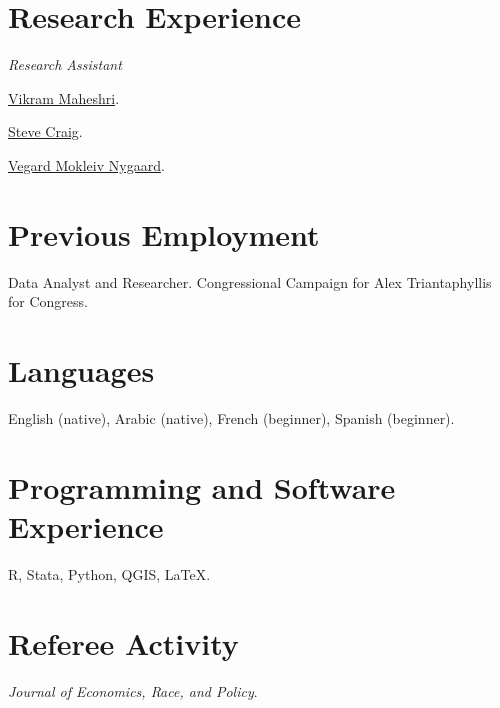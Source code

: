 \documentclass[letterpaper]{article}
\renewenvironment{itemize}{
  \begin{list}{}{
    \setlength{\leftmargin}{1.5em}
  }
}{
  \end{list}
}
\begin{document}
\section*{Research Experience}
\vspace{2 mm}
\textit{Research Assistant}
\begin{itemize}
\item {}\href{https://vmaheshri.github.io/}{Vikram Maheshri}.
\item {}\href{https://www.uh.edu/class/economics/people/current-faculty/steve/}{Steve Craig}.
\item {}\href{https://sites.google.com/site/vegardmokleivnygaard/}{Vegard Mokleiv Nygaard}.
\end{itemize}
\vspace{2 mm}

\section*{Previous Employment}
\vspace{2 mm}
\begin{itemize}
\item {}Data Analyst and Researcher. Congressional Campaign for Alex Triantaphyllis for Congress.
\end{itemize}
\vspace{2 mm}

\section*{Languages}
\vspace{2 mm}
{\makebox[2.3cm]{\hfill}}English (native), Arabic (native), French (beginner), Spanish (beginner).
\vspace{2 mm}


\section*{Programming and Software Experience}
\vspace{2 mm}
{\makebox[2.3cm]{\hfill}}R, Stata, Python, QGIS, \LaTeX.
\vspace{2 mm}

\section*{Referee Activity}
\vspace{2 mm}
{\makebox[2.3cm]{\hfill}}\textit{Journal of Economics, Race, and Policy}.
\vspace{2 mm}
\end{document}
